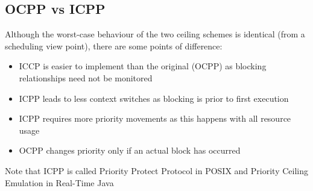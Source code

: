 \subsection{OCPP vs ICPP}
Although the worst-case behaviour of the two ceiling
schemes is identical (from a scheduling view point), there
are some points of difference:
\begin{itemize}
\item ICCP is easier to implement than the original (OCPP) as
blocking relationships need not be monitored
\item ICPP leads to less context switches as blocking is prior to
first execution
\item ICPP requires more priority movements as this happens
with all resource usage
\item OCPP changes priority only if an actual block has
occurred
\end{itemize}

Note that ICPP is called Priority Protect Protocol in
POSIX and Priority Ceiling Emulation in Real-Time
Java